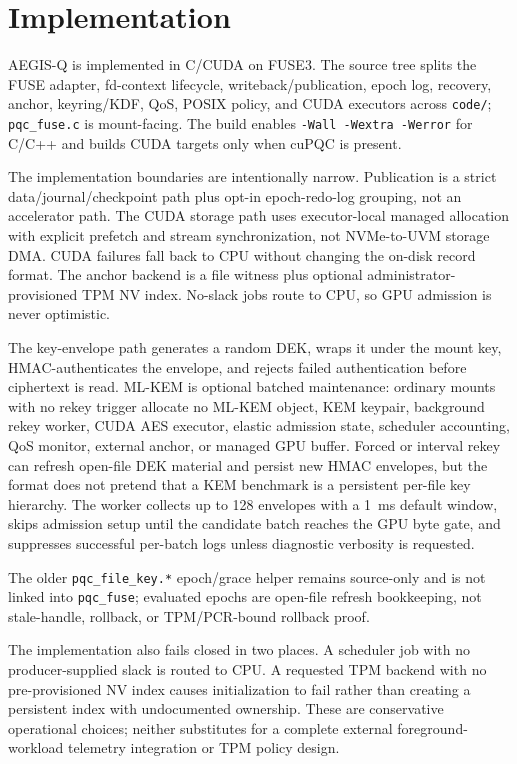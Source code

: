 \section{Implementation}
\label{sec:design_impl}

AEGIS-Q is implemented in C/CUDA on FUSE3.  The source tree splits the FUSE adapter, fd-context lifecycle, writeback/publication, epoch log, recovery, anchor, keyring/KDF, QoS, POSIX policy, and CUDA executors across \texttt{code/}; \texttt{pqc\_fuse.c} is mount-facing.  The build enables \texttt{-Wall -Wextra -Werror} for C/C++ and builds CUDA targets only when cuPQC is present.

The implementation boundaries are intentionally narrow.  Publication is a strict data/journal/checkpoint path plus opt-in epoch-redo-log grouping, not an accelerator path.  The CUDA storage path uses executor-local managed allocation with explicit prefetch and stream synchronization, not NVMe-to-UVM storage DMA.  CUDA failures fall back to CPU without changing the on-disk record format.  The anchor backend is a file witness plus optional administrator-provisioned TPM NV index.  No-slack jobs route to CPU, so GPU admission is never optimistic.

The key-envelope path generates a random DEK, wraps it under the mount key, HMAC-authenticates the envelope, and rejects failed authentication before ciphertext is read.  ML-KEM is optional batched maintenance: ordinary mounts with no rekey trigger allocate no ML-KEM object, KEM keypair, background rekey worker, CUDA AES executor, elastic admission state, scheduler accounting, QoS monitor, external anchor, or managed GPU buffer.  Forced or interval rekey can refresh open-file DEK material and persist new HMAC envelopes, but the format does not pretend that a KEM benchmark is a persistent per-file key hierarchy.  The worker collects up to 128 envelopes with a 1~ms default window, skips admission setup until the candidate batch reaches the GPU byte gate, and suppresses successful per-batch logs unless diagnostic verbosity is requested.

The older \texttt{pqc\_file\_key.*} epoch/grace helper remains source-only and is not linked into \texttt{pqc\_fuse}; evaluated epochs are open-file refresh bookkeeping, not stale-handle, rollback, or TPM/PCR-bound rollback proof.

The implementation also fails closed in two places.  A scheduler job with no producer-supplied slack is routed to CPU.  A requested TPM backend with no pre-provisioned NV index causes initialization to fail rather than creating a persistent index with undocumented ownership.  These are conservative operational choices; neither substitutes for a complete external foreground-workload telemetry integration or TPM policy design.

